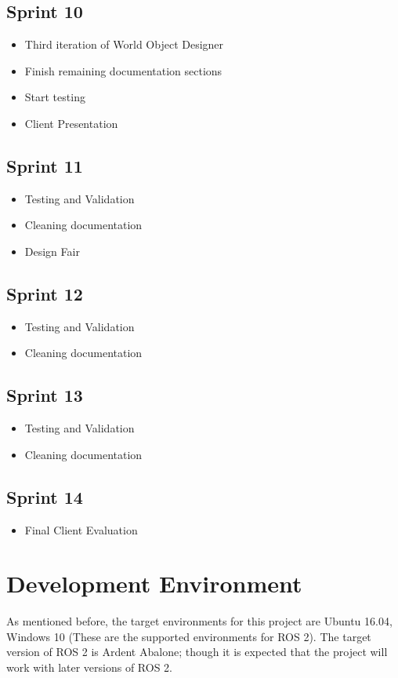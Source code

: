 \subsection{Sprint 10}
\begin{itemize}
	\item Third iteration of World Object Designer
	\item Finish remaining documentation sections
	\item Start testing
	\item Client Presentation
\end{itemize}

\subsection{Sprint 11}
\begin{itemize}
	\item Testing and Validation
	\item Cleaning documentation
	\item Design Fair
\end{itemize}

\subsection{Sprint 12}
\begin{itemize}
	\item Testing and Validation
	\item Cleaning documentation
\end{itemize}

\subsection{Sprint 13}
\begin{itemize}
	\item Testing and Validation
	\item Cleaning documentation
\end{itemize}

\subsection{Sprint 14}
\begin{itemize}
	\item Final Client Evaluation
\end{itemize}

\section{Development Environment}
As mentioned before, the target environments for this project are Ubuntu 16.04, Windows 10 (These are the supported environments for ROS 2). The target version of ROS 2 is Ardent Abalone; though it is expected that the project will work with later versions of ROS 2.

